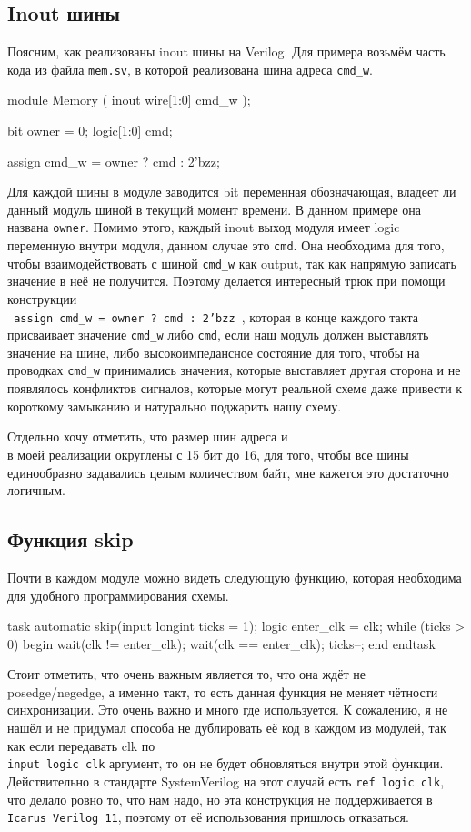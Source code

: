 \documentclass[14pt, russian, onesize]{extreport}
\begin{document}
\subsection*{ Inout шины }
Поясним, как реализованы inout шины на Verilog. Для примера
возьмём часть кода из файла \texttt{mem.sv}, в которой
реализована шина адреса \texttt{cmd\_w}.
\begin{svcode}
module Memory
    (
        inout wire[1:0] cmd_w
    );

    bit owner = 0;
    logic[1:0] cmd;

    assign cmd_w = owner ? cmd : 2'bzz;

\end{svcode}
Для каждой шины в модуле 
заводится bit переменная обозначающая, владеет ли данный модуль
шиной в текущий момент времени. В данном примере она названа \texttt{owner}.
Помимо этого, каждый inout 
выход модуля имеет logic переменную внутри модуля, данном
случае это \texttt{cmd}. Она необходима
для того, чтобы взаимодействовать с шиной \texttt{cmd\_w} как output,
так как напрямую записать значение в неё не получится. Поэтому
делается интересный трюк при помощи конструкции\\
\texttt{ assign cmd_w = owner ? cmd : 2'bzz },
которая в конце каждого такта присваивает значение \texttt{cmd\_w}
либо \texttt{cmd}, если наш модуль должен выставлять значение
на шине, либо высокоимпедансное состояние для того, чтобы
на проводках \texttt{cmd\_w} принимались значения, которые 
выставляет другая сторона и не появлялось конфликтов сигналов,
которые могут реальной схеме даже привести к короткому замыканию
и натурально поджарить нашу схему.

Отдельно хочу отметить, что размер шин адреса 
 и\\  в моей реализации
округлены с 15 бит до 16, для того, чтобы все шины единообразно
задавались целым количеством байт, мне кажется это достаточно
логичным.
\subsection*{ Функция skip }
Почти в каждом модуле можно видеть следующую функцию, которая
необходима для удобного программирования схемы.
\begin{svcode}
    task automatic skip(input longint ticks = 1);
        logic enter_clk = clk;
        while (ticks > 0) begin
            wait(clk != enter_clk);
            wait(clk == enter_clk);
            ticks--;
        end
    endtask
\end{svcode}
Стоит отметить, что очень важным является то, что она
ждёт не posedge\slash negedge, а именно такт, то есть
данная функция не меняет чётности синхронизации. Это
очень важно и много где используется.
К сожалению, я не нашёл и не придумал способа не дублировать
её код в каждом из модулей, так как если передавать clk по\\
\texttt{input logic clk} аргумент, то он не будет
обновляться внутри этой функции. Действительно в стандарте
SystemVerilog на этот случай есть \texttt{ref logic clk},
что делало ровно то, что нам надо, но эта конструкция не 
поддерживается в \texttt{Icarus Verilog 11}, поэтому от
её использования пришлось отказаться. 
\end{document}
